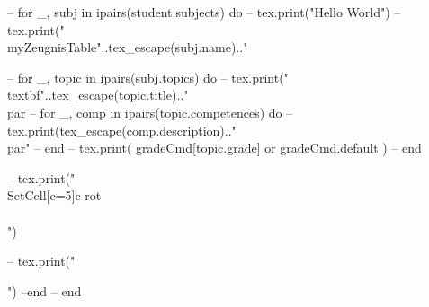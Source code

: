 \begin{luacode*}
--	for _, subj in ipairs(student.subjects) do
--	tex.print("Hello World")
--	tex.print("\\myZeugnisTable{"..tex_escape(subj.name).."}{%

		--	for _, topic in ipairs(subj.topics) do
		--	tex.print("\\textbf{"..tex_escape(topic.title).."}\\par%
		--	for _, comp in ipairs(topic.competences) do
		--	tex.print(tex_escape(comp.description).."\\par"%
		--	end
		--	tex.print( gradeCmd[topic.grade] or gradeCmd.default )
		--	end

		--	tex.print("\\SetCell[c=5]{c} rot \\\\")
			
		--	tex.print("}")
		--end
--	end
\end{luacode*}

%

	
